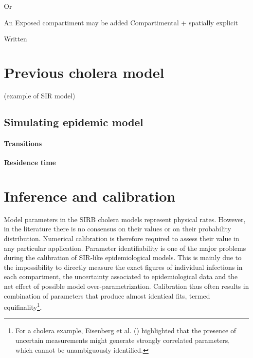 Or

An Exposed compartiment may be added 
Compartimental + spatially explicit


Written

\section{Previous cholera model}

(example of SIR model)



\subsection{Simulating epidemic model}


\paragraph{Transitions}



\paragraph{Residence time}

\cite{Hurtado:GeneralizationsLinearChain:2019}


\section{Inference and calibration} 
Model parameters in the SIRB cholera models represent physical rates. However, in the literature there is no consensus on their values or on their  probability distribution. Numerical calibration is therefore required to assess their value in any particular application. Parameter identifiability is one of the major problems during the calibration of SIR-like epidemiological models. This is mainly due to the impossibility to directly measure the exact figures of individual infections in each compartment, the uncertainty associated to epidemiological data and the net effect of possible model over-parametrization. Calibration thus often results in combination of parameters that produce almost identical fits, termed equifinality\footnote{For a cholera example, Eisenberg et al. () highlighted that the presence of uncertain measurements might generate strongly correlated parameters, which cannot be unambiguously identified.}.

